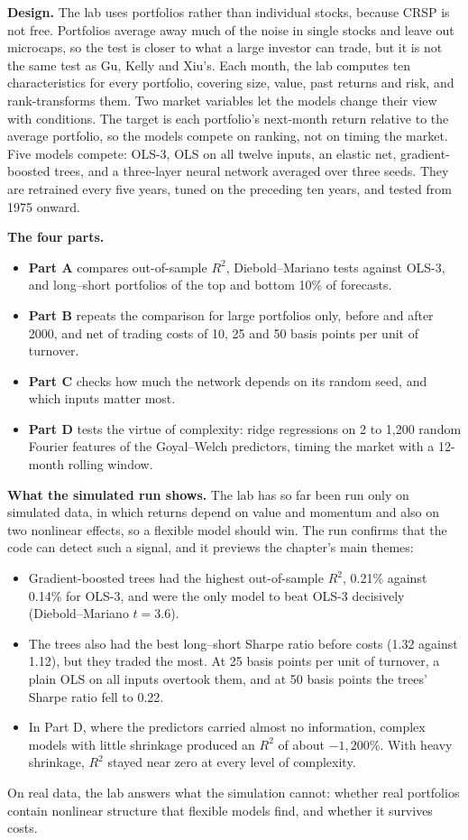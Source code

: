 \textbf{Design.} The lab uses portfolios rather than individual stocks, because CRSP is not free. Portfolios average away much of the noise in single stocks and leave out microcaps, so the test is closer to what a large investor can trade, but it is not the same test as Gu, Kelly and Xiu's. Each month, the lab computes ten characteristics for every portfolio, covering size, value, past returns and risk, and rank-transforms them. Two market variables let the models change their view with conditions. The target is each portfolio's next-month return relative to the average portfolio, so the models compete on ranking, not on timing the market. Five models compete: OLS-3, OLS on all twelve inputs, an elastic net, gradient-boosted trees, and a three-layer neural network averaged over three seeds. They are retrained every five years, tuned on the preceding ten years, and tested from 1975 onward.

\textbf{The four parts.}
\begin{itemize}
  \item \textbf{Part A} compares out-of-sample $R^2$, Diebold--Mariano tests against OLS-3, and long--short portfolios of the top and bottom 10\% of forecasts.
  \item \textbf{Part B} repeats the comparison for large portfolios only, before and after 2000, and net of trading costs of 10, 25 and 50 basis points per unit of turnover.
  \item \textbf{Part C} checks how much the network depends on its random seed, and which inputs matter most.
  \item \textbf{Part D} tests the virtue of complexity: ridge regressions on 2 to 1,200 random Fourier features of the Goyal--Welch predictors, timing the market with a 12-month rolling window.
\end{itemize}

\textbf{What the simulated run shows.} The lab has so far been run only on simulated data, in which returns depend on value and momentum and also on two nonlinear effects, so a flexible model should win. The run confirms that the code can detect such a signal, and it previews the chapter's main themes:
\begin{itemize}
  \item Gradient-boosted trees had the highest out-of-sample $R^2$, 0.21\% against 0.14\% for OLS-3, and were the only model to beat OLS-3 decisively (Diebold--Mariano $t = 3.6$).
  \item The trees also had the best long--short Sharpe ratio before costs (1.32 against 1.12), but they traded the most. At 25 basis points per unit of turnover, a plain OLS on all inputs overtook them, and at 50 basis points the trees' Sharpe ratio fell to 0.22.
  \item In Part D, where the predictors carried almost no information, complex models with little shrinkage produced an $R^2$ of about $-1{,}200\%$. With heavy shrinkage, $R^2$ stayed near zero at every level of complexity.
\end{itemize}
On real data, the lab answers what the simulation cannot: whether real portfolios contain nonlinear structure that flexible models find, and whether it survives costs.


